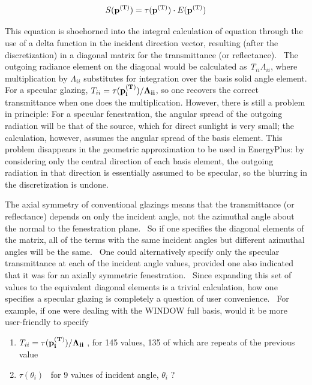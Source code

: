 \begin{equation}
S({{\bf{p}}^{{\rm{(T)}}}}) = \tau ({{\bf{p}}^{{\rm{(T)}}}}) \cdot E({{\bf{p}}^{{\rm{(T)}}}})
\end{equation}

This equation is shoehorned into the integral calculation of equation through the use of a delta function in the incident direction vector, resulting (after the discretization) in a diagonal matrix for the transmittance (or reflectance).~ The outgoing radiance element on the diagonal would be calculated as \emph{T\(_{ii}\)}\emph{\(\Lambda\)\(_{ii}\)}, where multiplication by \emph{\(\Lambda\)\(_{ii}\)} substitutes for integration over the basis solid angle element. For a specular glazing, \(T_{ii} = \tau(\bf{p}_i^{(T)})/\Lambda_{ii}\), so one recovers the correct transmittance when one does the multiplication. However, there is still a problem in principle: For a specular fenestration, the angular spread of the outgoing radiation will be that of the source, which for direct sunlight is very small; the calculation, however, assumes the angular spread of the basis element. This problem disappears in the geometric approximation to be used in EnergyPlus: by considering only the central direction of each basis element, the outgoing radiation in that direction is essentially assumed to be specular, so the blurring in the discretization is undone.

The axial symmetry of conventional glazings means that the transmittance (or reflectance) depends on only the incident angle, not the azimuthal angle about the normal to the fenestration plane.~ So if one specifies the diagonal elements of the matrix, all of the terms with the same incident angles but different azimuthal angles will be the same.~ One could alternatively specify only the specular transmittance at each of the incident angle values, provided one also indicated that it was for an axially symmetric fenestration.~ Since expanding this set of values to the equivalent diagonal elements is a trivial calculation, how one specifies a specular glazing is completely a question of user convenience.~ For example, if one were dealing with the WINDOW full basis, would it be more user-friendly to specify

\begin{enumerate}
\def\labelenumi{(\arabic{enumi})}
\item
  \(T_{ii} = \tau(\bf{p}_i^{(T)})/\Lambda_{ii}\) , for 145 values, 135 of which are repeats of the previous value
\item
  \(\tau ({\theta_i})\) ~for 9 values of incident angle, \emph{\(\theta\)\(_{i}\)} ?
\end{enumerate}

